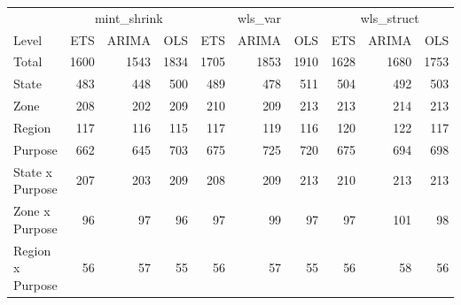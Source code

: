 \documentclass[11pt,a4paper,]{article}
\let\origtable\table
\let\endorigtable\endtable
\renewenvironment{table}[1][2] {
    \expandafter\origtable\expandafter[!htbp]
} {
    \endorigtable
}
\begin{document}
\begin{table}

\caption{\label{tab:Tourismdatadifrecrolling}Comparing Mean(RMSE) of three   different reconciliation matrices for rolling origin forecasts on a 24 months test set.}
\centering
\begin{tabular}[t]{lrrrrrrrrr}
\toprule
\multicolumn{1}{c}{} & \multicolumn{3}{c}{mint\_shrink} & \multicolumn{3}{c}{wls\_var} & \multicolumn{3}{c}{wls\_struct} \\
\cmidrule(l{3pt}r{3pt}){2-4} \cmidrule(l{3pt}r{3pt}){5-7} \cmidrule(l{3pt}r{3pt}){8-10}
Level & ETS & ARIMA & OLS & ETS & ARIMA & OLS & ETS & ARIMA & OLS\\
\midrule
Total & 1600 & 1543 & 1834 & 1705 & 1853 & 1910 & 1628 & 1680 & 1753\\
State & 483 & 448 & 500 & 489 & 478 & 511 & 504 & 492 & 503\\
Zone & 208 & 202 & 209 & 210 & 209 & 213 & 213 & 214 & 213\\
Region & 117 & 116 & 115 & 117 & 119 & 116 & 120 & 122 & 117\\
Purpose & 662 & 645 & 703 & 675 & 725 & 720 & 675 & 694 & 698\\
State x Purpose & 207 & 203 & 209 & 208 & 209 & 213 & 210 & 213 & 213\\
Zone x Purpose & 96 & 97 & 96 & 97 & 99 & 97 & 97 & 101 & 98\\
Region x Purpose & 56 & 57 & 55 & 56 & 57 & 55 & 56 & 58 & 56\\
\bottomrule
\end{tabular}
\end{table}
\end{document}
